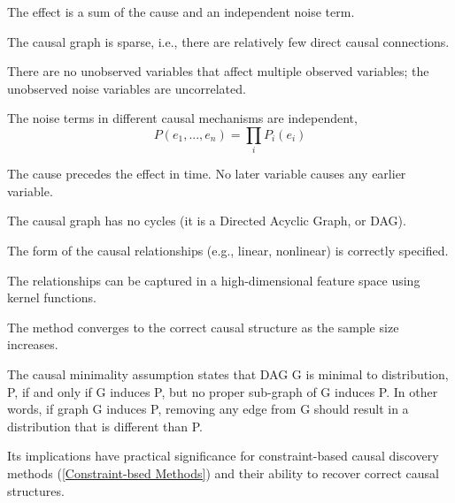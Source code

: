 \begin{definition}[Additivity]
    The effect is a sum of the cause and an independent noise term.
\end{definition}
\begin{definition}[Sparsity]
    The causal graph is sparse, i.e., there are relatively few direct causal connections.
\end{definition}
\begin{definition} 
    There are no unobserved variables that affect multiple observed variables; the unobserved noise variables are uncorrelated.
\end{definition}
\begin{definition}
    The noise terms in different causal mechanisms are independent, $$P(e_1, ..., e_n) = \prod_i P_i(e_i)$$
\end{definition}
\begin{definition}
    The cause precedes the effect in time. No later variable causes any earlier variable.
\end{definition}
\begin{definition}[Acyclicity]
    The causal graph has no cycles (it is a Directed Acyclic Graph, or DAG).
\end{definition}
\begin{definition}
    The form of the causal relationships (e.g., linear, nonlinear) is correctly specified.
\end{definition}
\begin{definition}
    The relationships can be captured in a high-dimensional feature space using kernel functions.
\end{definition}
\begin{definition}[Consistency]
    The method converges to the correct causal structure as the sample size increases.
\end{definition}
\begin{definition}
    The causal minimality assumption states that DAG G is minimal to distribution, P, if and only if G induces P, but no proper sub-graph of G induces P. In other words, if graph G induces P, removing any edge from G should result in a distribution that is different than P.
\end{definition}
Its implications have practical significance for constraint-based causal discovery methods (\ref{Constraint-bsed Methods}) and their ability to recover correct causal structures.
